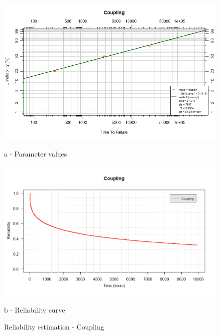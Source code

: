\begin{figure}[!htb]
	\begin{minipage}[b]{0.5\linewidth}
		\centering
		\includegraphics[width=\textwidth]{figures/ch05_fig_reliability_coupling_parameter}
		\caption*{a - Parameter values}
	\end{minipage}
	\hspace{0.05cm}
	\begin{minipage}[b]{0.5\linewidth}
		\centering
		\includegraphics[width=\textwidth]{figures/ch05_fig_reliability_coupling_curve}
		\caption*{b - Reliability curve}
	\end{minipage}
	\caption{Reliability estimation - Coupling}
	\label{ch05_fig_reliability_coupling}
\end{figure}